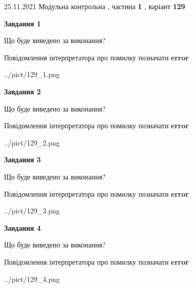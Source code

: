 \documentclass[10pt, ukrainian]{article}
\begin{document}
{25.11.2021 Модульна контрольна , частина \textbf { 1 }, варіант  \No \textbf { 129 }\par}
{
\begin {large}

{\begin {center}\textbf{Завдання 1}\end {center}}\par
Що буде виведено за виконання? \par
Повідомлення інтерпретатора про помилку позначати \textbf{error}

\begin{center}
	{../pict/129_1.png}
\end{center}
\newpage

{\begin {center}\textbf{Завдання 2}\end {center}}\par
Що буде виведено за виконання? \par
Повідомлення інтерпретатора про помилку позначати \textbf{error}

\begin{center}
	{../pict/129_2.png}
\end{center}
\newpage

{\begin {center}\textbf{Завдання 3}\end {center}}\par
Що буде виведено за виконання? \par
Повідомлення інтерпретатора про помилку позначати \textbf{error}

\begin{center}
	{../pict/129_3.png}
\end{center}
\newpage

{\begin {center}\textbf{Завдання 4}\end {center}}\par
Що буде виведено за виконання? \par
Повідомлення інтерпретатора про помилку позначати \textbf{error}

\begin{center}
	{../pict/129_4.png}
\end{center}
\newpage


\end{large}}
\end{document}
